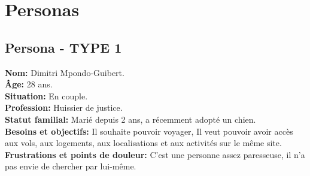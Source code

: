\documentclass[a4paper,11pt]{article}
\begin{document}
\section{Personas}

\subsection{Persona - TYPE 1}
\begin{minipage}{0.6\textwidth} %
    \textbf{Nom:} Dimitri Mpondo-Guibert.\\
    \textbf{Âge:} 28 ans.\\
    \textbf{Situation:} En couple.\\
    \textbf{Profession:} Huissier de justice.\\
    \textbf{Statut familial:} Marié depuis 2 ans, a récemment adopté un chien.\\
    \textbf{Besoins et objectifs:} Il souhaite pouvoir voyager, Il veut pouvoir avoir accès aux vols, aux logements, aux localisations et aux activités sur le même site.\\
    \textbf{Frustrations et points de douleur:} C'est une personne assez paresseuse, il n'a pas envie de chercher par lui-même.\\
\end{minipage}%
\hspace{1cm}
\end{document}
